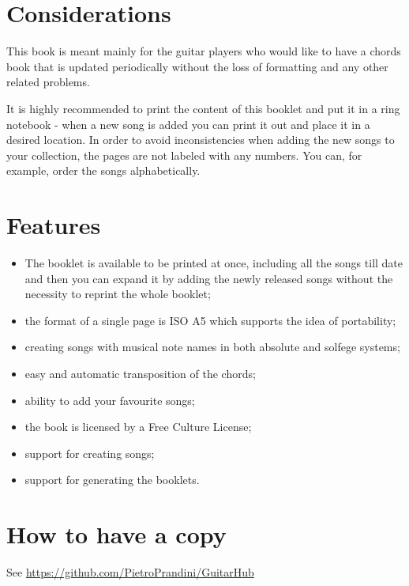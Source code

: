 %
%
%
%

\section*{Considerations}
This book is meant mainly for the guitar players who would like to have a chords book that is updated periodically without the loss of formatting and any other related problems.\par
It is highly recommended to print the content of this booklet and put it in a ring notebook - when a new song is added you can print it out and place it in a desired location. In order to avoid inconsistencies when adding the new songs to your collection, the pages are not labeled with any numbers. You can, for example, order the songs alphabetically.\par

\section*{Features}
\begin{itemize}
\item The booklet is available to be printed at once, including all the songs till date and then you can expand it by adding the newly released songs without the necessity to reprint the whole booklet;
\item the format of a single page is ISO A5 which supports the idea of  portability;
\item creating songs with musical note names in both absolute and solfege systems;
\item easy and automatic transposition of the chords;
\item ability to add your favourite songs;
\item the book is licensed by a Free Culture License;
\item support for creating songs;
\item support for generating the booklets.
\end{itemize}

\section*{How to have a copy}
See \href{https://github.com/PietroPrandini/GuitarHub}{https://github.com/PietroPrandini/GuitarHub}

\begin{center}
\end{center}
\newpage
